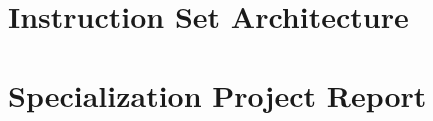 \appendix



\chapter{Instruction Set Architecture}
\label{app:isa}
\cleardoublepage


\chapter{Specialization Project Report}
\label{app:spec-proj-report}

